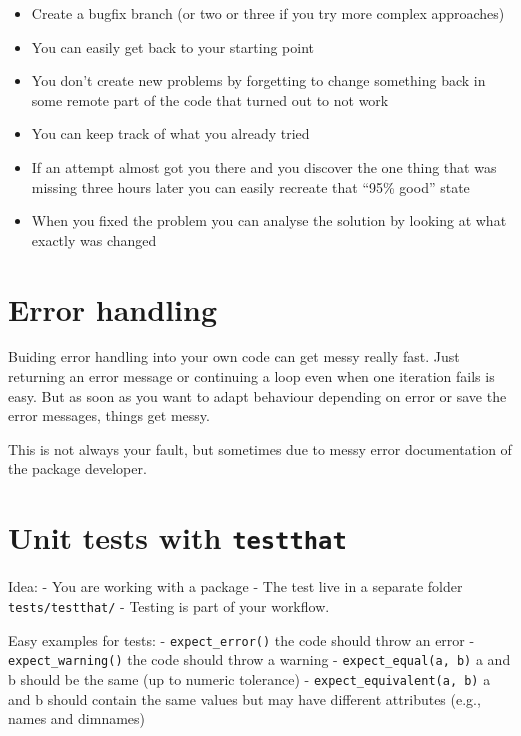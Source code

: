 \documentclass[]{book}
\providecommand{\tightlist}{%
  \setlength{\itemsep}{0pt}\setlength{\parskip}{0pt}}
\begin{document}
\begin{itemize}
\tightlist
\item
  Create a bugfix branch (or two or three if you try more complex approaches)
\item
  You can easily get back to your starting point
\item
  You don't create new problems by forgetting to change something back in some remote part of the code
  that turned out to not work
\item
  You can keep track of what you already tried
\item
  If an attempt almost got you there and you discover the one thing that was
  missing three hours later you can easily recreate that ``95\% good'' state
\item
  When you fixed the problem you can analyse the solution by looking at what exactly was changed
\end{itemize}

\hypertarget{error-handling}{%
\chapter{Error handling}\label{error-handling}}

Buiding error handling into your own code can get messy really fast.
Just returning an error message or continuing a loop even when one iteration fails
is easy.
But as soon as you want to adapt behaviour depending on error or save the error messages,
things get messy.

This is not always your fault, but sometimes due to messy error documentation of the package developer.

\hypertarget{unit-tests-with-testthat}{%
\chapter{\texorpdfstring{Unit tests with \texttt{testthat}}{Unit tests with testthat}}\label{unit-tests-with-testthat}}

Idea:
- You are working with a package
- The test live in a separate folder \texttt{tests/testthat/}
- Testing is part of your workflow.

Easy examples for tests:
- \texttt{expect\_error()} the code should throw an error
- \texttt{expect\_warning()} the code should throw a warning
- \texttt{expect\_equal(a,\ b)} a and b should be the same (up to numeric tolerance)
- \texttt{expect\_equivalent(a,\ b)} a and b should contain the same values but may have different attributes (e.g., names and dimnames)
\end{document}
